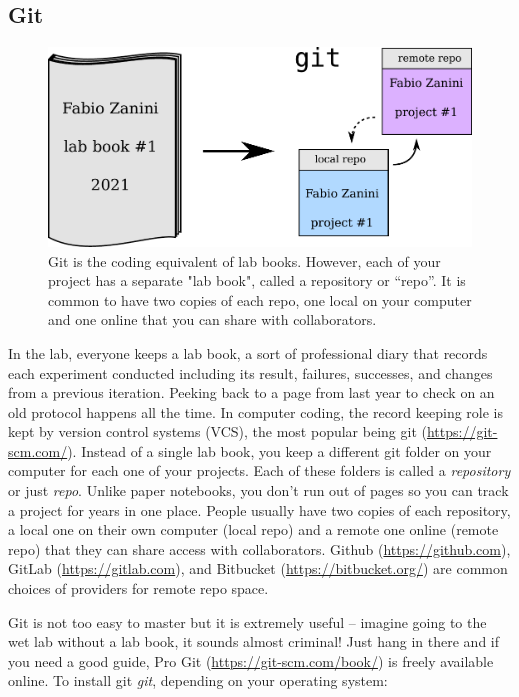 \documentclass[12pt,a4paper,notitlepage,onecolumn]{article}
\begin{document}
\subsection{Git}
\begin{figure}
\begin{center}
\includegraphics[width=0.8\linewidth]{git.pdf}
\caption{Git is the coding equivalent of lab books. However, each of your project has a separate "lab book", called a repository or ``repo''. It is common to have two copies of each repo, one local on your computer and one online that you can share with collaborators.}
\label{}
\end{center}
\end{figure}
In the lab, everyone keeps a lab book, a sort of professional diary that records each experiment conducted including its result, failures, successes, and changes from a previous iteration. Peeking back to a page from last year to check on an old protocol happens all the time. In computer coding, the record keeping role is kept by version control systems (VCS), the most popular being git (\url{https://git-scm.com/}). Instead of a single lab book, you keep a different git folder on your computer for each 
one of your projects. Each of these folders is called a \textit{repository} or just \textit{repo}. Unlike paper notebooks, you don't run out of pages so you can track a project for years in one place. People usually have two copies of each repository, a local one on their own computer (local repo) and a remote one online (remote repo) that they can share access with collaborators. Github (\url{https://github.com}), GitLab (\url{https://gitlab.com}), and Bitbucket (\url{https://bitbucket.org/}) are common choices of providers for remote repo space.

Git is not too easy to master but it is extremely useful -- imagine going to the wet lab without a lab book, it sounds almost criminal! Just hang in there and if you need a good guide, Pro Git (\url{https://git-scm.com/book/}) is freely available online. 
To install git \textit{git}, depending on your operating system:
\end{document}
